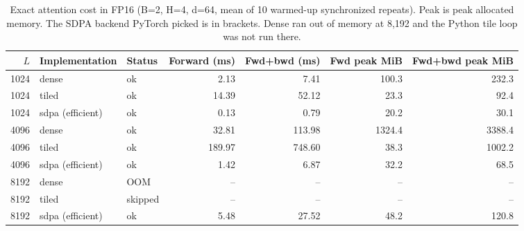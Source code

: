 \begin{table}[!htb]
\centering
\scriptsize
\setlength{\tabcolsep}{3.5pt}
\caption{Exact attention cost in FP16 (B=2, H=4, d=64, mean of 10 warmed-up synchronized repeats). Peak is peak allocated memory. The SDPA backend PyTorch picked is in brackets. Dense ran out of memory at 8,192 and the Python tile loop was not run there.}
\label{tab:t2atime}
\begin{adjustbox}{max width=\linewidth}
\begin{tabular}{rllrrrr}
\toprule
$L$ & Implementation & Status & Forward (ms) & Fwd+bwd (ms) & Fwd peak MiB & Fwd+bwd peak MiB \\
\midrule
1024 & dense & ok & 2.13 & 7.41 & 100.3 & 232.3 \\
1024 & tiled & ok & 14.39 & 52.12 & 23.3 & 92.4 \\
1024 & sdpa (efficient) & ok & 0.13 & 0.79 & 20.2 & 30.1 \\
4096 & dense & ok & 32.81 & 113.98 & 1324.4 & 3388.4 \\
4096 & tiled & ok & 189.97 & 748.60 & 38.3 & 1002.2 \\
4096 & sdpa (efficient) & ok & 1.42 & 6.87 & 32.2 & 68.5 \\
8192 & dense & OOM & -- & -- & -- & -- \\
8192 & tiled & skipped & -- & -- & -- & -- \\
8192 & sdpa (efficient) & ok & 5.48 & 27.52 & 48.2 & 120.8 \\
\bottomrule
\end{tabular}
\end{adjustbox}
\end{table}
